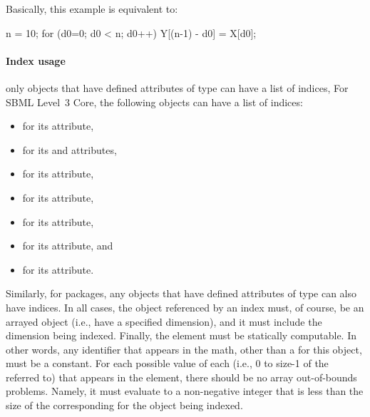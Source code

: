 Basically, this example is equivalent to:

\begin{example}
n = 10;
for (d0=0; d0 < n; d0++) {
  Y[(n-1) - d0] = X[d0];
}
\end{example}

\paragraph{Index usage}

 only objects that have defined attributes of  type can have a list of indices,    For SBML Level~3 Core, the following objects can have a list of indices:
\begin{itemize}\setlength{\parskip}{-0.2ex}
\item \Model for its  attribute,
\item \Species for its  and  attributes,
\item \Reaction for its  attribute,
\item \InitialAssignment for its  attribute,
\item \Rule for its  attribute,
\item \SpeciesReference for its  attribute, and
\item \EventAssignment for its  attribute.
\end{itemize}
Similarly, for packages, any objects that have defined attributes of  type can also have indices.     In all cases, the object referenced by an index must, of course, be an arrayed object (i.e., have a specified dimension), and it must include the dimension being indexed.
Finally, the  element must be statically computable.   In other words, any identifier that appears in the math, other than a \Dimension {} for this object, must be a constant.   For each possible value of each \Dimension {}  (i.e., 0 to size-1 of the \Dimension referred to) that appears in the  element, there should be no array out-of-bounds problems.   Namely, it must evaluate to a non-negative integer that is less than the size of the corresponding \Dimension for the object being indexed.

